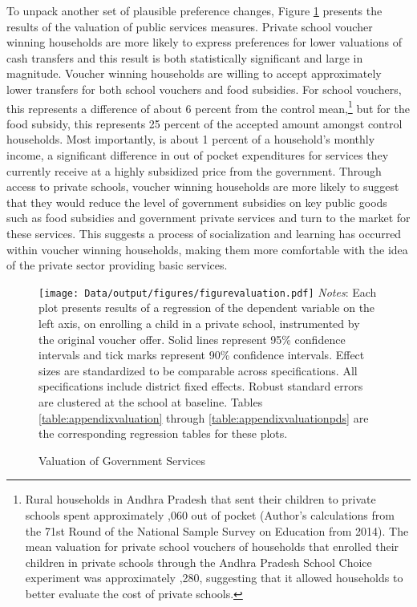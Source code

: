 \documentclass[hidelinks, 12pt, titlepage]{article}
\begin{document}
To unpack another set of plausible preference changes, Figure \ref{fig:valuation} presents the results of the valuation of public services measures.  Private school voucher winning households are more likely to express preferences for lower valuations of cash transfers and this result is both statistically significant and large in magnitude.  Voucher winning households are willing to accept approximately  lower transfers for both school vouchers and food subsidies.  For school vouchers, this represents a difference of about 6 percent from the control mean,\footnote{Rural households in Andhra Pradesh that sent their children to private schools spent approximately ,060 out of pocket (Author's calculations from the 71st Round of the National Sample Survey on Education from 2014). The mean valuation for private school vouchers of households that enrolled their children in private schools through the Andhra Pradesh School Choice experiment was approximately ,280, suggesting that it allowed households to better evaluate the cost of private schools.} but for the food subsidy, this represents 25 percent of the accepted amount amongst control households.  Most importantly,  is about 1 percent of a household's monthly income, a significant difference in out of pocket expenditures for services they currently receive at a highly subsidized price from the government.  Through access to private schools, voucher winning households are more likely to suggest that they would reduce the level of government subsidies on key public goods such as food subsidies and government private services and turn to the market for these services.  This suggests a process of socialization and learning has occurred within voucher winning households, making them more comfortable with the idea of the private sector providing basic services.

\begin{figure}[htbp]
    \caption{Valuation of Government Services\label{fig:valuation}}
    \centering
    \begin{minipage}{5.5in}
        \texttt{[image: Data/output/figures/figurevaluation.pdf]}
        \footnotesize
        \emph{Notes}: Each plot presents results of a regression of the dependent variable on the left axis, on enrolling a child in a private school, instrumented by the original voucher offer.  Solid lines represent 95\% confidence intervals and tick marks represent 90\% confidence intervals.  Effect sizes are standardized to be comparable across specifications.  All specifications include district fixed effects.  Robust standard errors are clustered at the school at baseline. Tables \ref{table:appendixvaluation} through \ref{table:appendixvaluationpds} are the corresponding regression tables for these plots.
    \end{minipage}
\end{figure}
\end{document}

